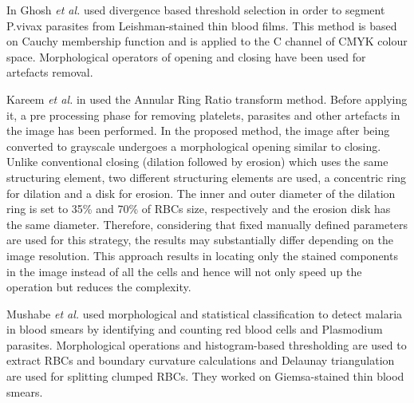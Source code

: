\documentclass[sensors,review,submit,moreauthors,pdftex,10pt,a4paper]{mdpi}
\begin{document}
In \cite{Ghosh2011} Ghosh \emph{et al.} used divergence based threshold selection in order to segment P.vivax parasites from Leishman-stained thin blood films. This method is based on Cauchy membership function \cite{DiRuberto2014} and is applied to the C channel of CMYK colour space. Morphological operators of opening and closing have been used for artefacts removal.

Kareem \emph{et al.} in \cite{Kareem2011} used the Annular Ring Ratio transform method. Before applying it, a pre processing phase for removing platelets, parasites and other artefacts in the image has been performed. In the proposed method, the image after being converted to grayscale undergoes a morphological opening similar to closing. Unlike conventional closing (dilation followed by erosion) which uses the same structuring element, two different structuring elements are used, a concentric ring for dilation and a disk for erosion. The inner and outer diameter of the dilation ring is set to 35\% and 70\% of RBCs size, respectively and the erosion disk has the same diameter. Therefore, considering that fixed manually defined parameters are used for this strategy, the results may substantially differ depending on the image resolution. This approach results in locating only the stained components in the image instead of all the cells and hence will not only speed up the operation but reduces the complexity.

Mushabe \emph{et al.} \cite{Mushabe2013} used morphological and statistical classification to detect malaria in blood smears by identifying and counting red blood cells and Plasmodium parasites. Morphological operations and histogram-based thresholding are used to extract RBCs and boundary curvature calculations and Delaunay triangulation are used for splitting clumped RBCs. They worked on Giemsa-stained thin blood smears.
\end{document}
